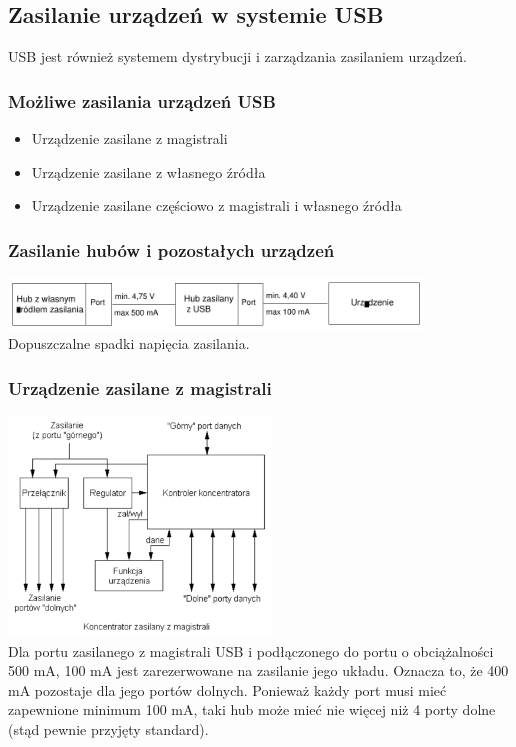 \subsection{Zasilanie urządzeń w systemie USB}
	USB jest również systemem dystrybucji i zarządzania zasilaniem urządzeń.
	\subsubsection{Możliwe zasilania urządzeń USB}
	\begin{itemize}
		\item Urządzenie zasilane z magistrali
		\item Urządzenie zasilane z własnego źródła
		\item Urządzenie zasilane częściowo z magistrali i własnego źródła
	\end{itemize}
	\subsubsection{Zasilanie hubów i pozostałych urządzeń}
		\includegraphics[width=11cm]{./wyklady/USB_38_1.pdf}\\
		Dopuszczalne spadki napięcia zasilania.
	\subsubsection{Urządzenie zasilane z magistrali}
		\includegraphics[width=7cm]{./wyklady/USB_39_1.pdf}\\
		Dla portu zasilanego z magistrali USB i podłączonego do portu o obciążalności 500 mA, 100 mA jest zarezerwowane na zasilanie jego układu. Oznacza to, że 400 mA pozostaje dla jego portów dolnych. Ponieważ każdy port musi mieć zapewnione minimum 100 mA, taki hub może mieć nie więcej niż 4 porty dolne (stąd pewnie przyjęty standard).
